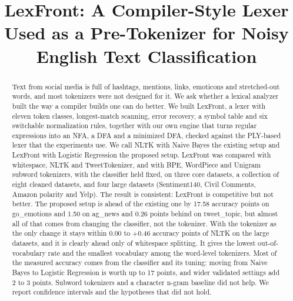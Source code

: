 \documentclass[journal,a4paper]{IEEEtran}
\begin{document}
\title{LexFront: A Compiler-Style Lexer Used as a Pre-Tokenizer for Noisy English Text Classification}
\author{
}
\maketitle

\begin{abstract}
Text from social media is full of hashtags, mentions, links, emoticons and stretched-out words, and most tokenizers were not designed for it. We ask whether a lexical analyzer built the way a compiler builds one can do better. We built LexFront, a lexer with eleven token classes, longest-match scanning, error recovery, a symbol table and six switchable normalization rules, together with our own engine that turns regular expressions into an NFA, a DFA and a minimized DFA, checked against the PLY-based lexer that the experiments use. We call NLTK with Naive Bayes the existing setup and LexFront with Logistic Regression the proposed setup. LexFront was compared with whitespace, NLTK and TweetTokenizer, and with BPE, WordPiece and Unigram subword tokenizers, with the classifier held fixed, on three core datasets, a collection of eight cleaned datasets, and four large datasets (Sentiment140, Civil Comments, Amazon polarity and Yelp). The result is consistent: LexFront is competitive but not better. The proposed setup is ahead of the existing one by 17.58 accuracy points on go\_emotions and 1.50 on ag\_news and 0.26 points behind on tweet\_topic, but almost all of that comes from changing the classifier, not the tokenizer. With the tokenizer as the only change it stays within 0.00 to $+$0.46 accuracy points of NLTK on the large datasets, and it is clearly ahead only of whitespace splitting. It gives the lowest out-of-vocabulary rate and the smallest vocabulary among the word-level tokenizers. Most of the measured accuracy comes from the classifier and its tuning: moving from Naive Bayes to Logistic Regression is worth up to 17 points, and wider validated settings add 2 to 3 points. Subword tokenizers and a character n-gram baseline did not help. We report confidence intervals and the hypotheses that did not hold.
\end{abstract}
\end{document}
